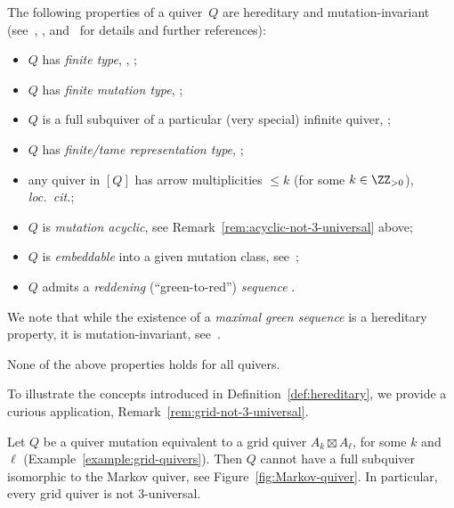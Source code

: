 \begin{example}
The following properties of a quiver~$Q$ are hereditary and mutation-invariant (see~\cite[Section~4.1]{FWZ}, \cite[Section~5.2]{keller-survey}, and~\cite[Section~3]{muller-max-green} for details and further references): 
\begin{itemize}%
\item 
$Q$ has \emph{finite type}, \cf \cite{ca2}, \cite[Remark~5.10.9]{FWZ}; %
\item 
$Q$ has \emph{finite mutation type}, \cf \cite[Proposition~4.1.4]{FWZ}; 
\item
$Q$ is a full subquiver of a particular (very special) infinite quiver, \cf \eg \cite{Henrich}; 
\item 
$Q$ has \emph{finite/tame representation type}, \cf \cite[Theorem~5.5]{keller-survey}; 
\item
any quiver in $[Q]$ has arrow multiplicities $\le k$ (for some $k\in\ZZ_{>0}$), \cf \emph{loc.\ cit.}; 
\item 
$Q$ is \emph{mutation acyclic}, see Remark~\ref{rem:acyclic-not-3-universal} above; 
\item
$Q$ is \emph{embeddable} into a given mutation class, see~\cite[Definition~4.1.8]{FWZ}; %
\item 
$Q$ admits a \emph{reddening} (``green-to-red'') \emph{sequence} 
\cite[Theorem~17, Corollary~19]{muller-max-green}. 
\end{itemize}
We note that while the existence of a \emph{maximal green sequence} is a hereditary property, it is  mutation-invariant, see~\cite[Theorem~9, Corollary~14]{muller-max-green}. 

None of the above properties holds for all quivers. 
\end{example}

To illustrate the concepts introduced in Definition~\ref{def:hereditary}, 
we provide a curious application, \cf Remark~\ref{rem:grid-not-3-universal}. 

\begin{proposition}
\label{prop:grid-no-markov}
Let $Q$ be a quiver mutation equivalent to a grid quiver $A_k\boxtimes A_\ell$, for some $k$ and~$\ell$ (\cf Example~\ref{example:grid-quivers}). Then $Q$ cannot have a full subquiver isomorphic to the Markov quiver, see Figure~\ref{fig:Markov-quiver}. In particular, every grid quiver is not $3$-universal. 
\end{proposition}

